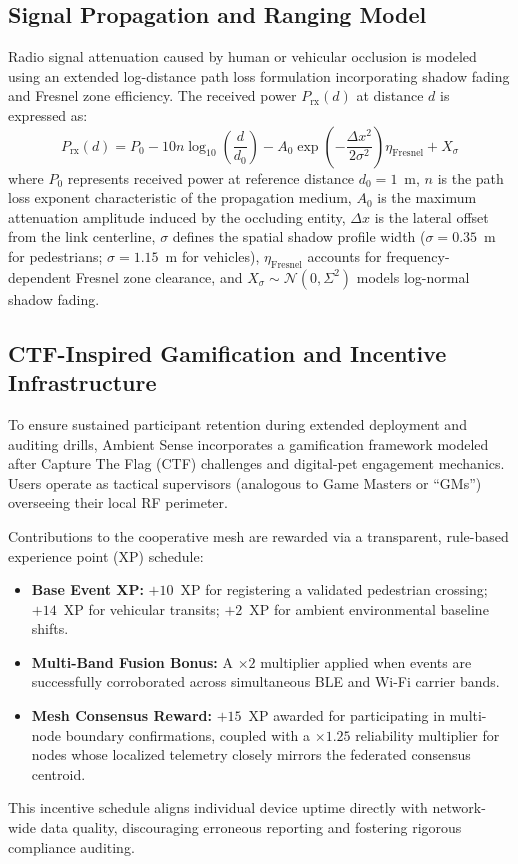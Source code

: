 \documentclass[journal,10pt]{IEEEtran}
\begin{document}
\subsection{Signal Propagation and Ranging Model}
Radio signal attenuation caused by human or vehicular occlusion is modeled using an extended log-distance path loss formulation incorporating shadow fading and Fresnel zone efficiency. The received power $P_{\mathrm{rx}}(d)$ at distance $d$ is expressed as:
\begin{equation}
P_{\mathrm{rx}}(d) = P_0 - 10n \log_{10}\left(\frac{d}{d_0}\right) - A_0 \exp\left(-\frac{\Delta x^2}{2\sigma^2}\right) \eta_{\mathrm{Fresnel}} + X_\sigma
\label{eq:pathloss}
\end{equation}
where $P_0$ represents received power at reference distance $d_0 = 1$~m, $n$ is the path loss exponent characteristic of the propagation medium, $A_0$ is the maximum attenuation amplitude induced by the occluding entity, $\Delta x$ is the lateral offset from the link centerline, $\sigma$ defines the spatial shadow profile width ($\sigma = 0.35$~m for pedestrians; $\sigma = 1.15$~m for vehicles), $\eta_{\mathrm{Fresnel}}$ accounts for frequency-dependent Fresnel zone clearance, and $X_\sigma \sim \mathcal{N}(0, \Sigma^2)$ models log-normal shadow fading.

\subsection{CTF-Inspired Gamification and Incentive Infrastructure}
To ensure sustained participant retention during extended deployment and auditing drills, Ambient Sense incorporates a gamification framework modeled after Capture The Flag (CTF) challenges and digital-pet engagement mechanics. Users operate as tactical supervisors (analogous to Game Masters or ``GMs'') overseeing their local RF perimeter. 

Contributions to the cooperative mesh are rewarded via a transparent, rule-based experience point (XP) schedule:
\begin{itemize}
    \item \textbf{Base Event XP:} $+10$~XP for registering a validated pedestrian crossing; $+14$~XP for vehicular transits; $+2$~XP for ambient environmental baseline shifts.
    \item \textbf{Multi-Band Fusion Bonus:} A $\times 2$ multiplier applied when events are successfully corroborated across simultaneous BLE and Wi-Fi carrier bands.
    \item \textbf{Mesh Consensus Reward:} $+15$~XP awarded for participating in multi-node boundary confirmations, coupled with a $\times 1.25$ reliability multiplier for nodes whose localized telemetry closely mirrors the federated consensus centroid.
\end{itemize}
This incentive schedule aligns individual device uptime directly with network-wide data quality, discouraging erroneous reporting and fostering rigorous compliance auditing.
\end{document}
